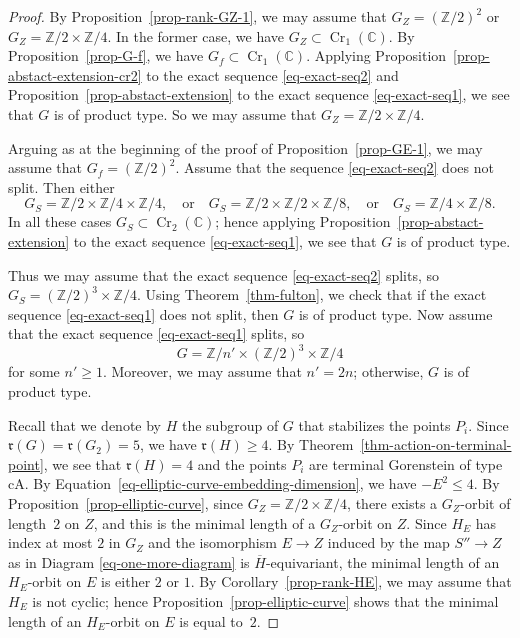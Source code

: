 \documentclass[11pt]{amsart}
\numberwithin{equation}{section}
\theoremstyle{definition}
\theoremstyle{remark}
\DeclareMathOperator{\Cr}{Cr}
\begin{document}
\begin{proof}
By Proposition~\ref{prop-rank-GZ-1}, we may assume that $G_Z=(\mathbb{Z}/2)^2$ or $G_Z=\mathbb{Z}/2\times\mathbb{Z}/4$. 
In the former case, we have $G_Z\subset \Cr_1(\mathbb{C})$. By Proposition~\ref{prop-G-f}, we have $G_f\subset \Cr_1(\mathbb{C})$. Applying Proposition~\ref{prop-abstact-extension-cr2} to the exact sequence \eqref{eq-exact-seq2} and Proposition~\ref{prop-abstact-extension} to the exact sequence \eqref{eq-exact-seq1}, we see that $G$ is of product type. 
So we may assume that $G_Z=\mathbb{Z}/2\times\mathbb{Z}/4$. 

 Arguing as at the beginning of the proof of Proposition~\ref{prop-GE-1}, we may assume that $G_f=(\mathbb{Z}/2)^2$. 
Assume that the sequence \eqref{eq-exact-seq2} does not split. Then either 
\[
G_S= \mathbb{Z}/2\times\mathbb{Z}/4\times\mathbb{Z}/4, \quad \text{or} \quad G_S= \mathbb{Z}/2\times\mathbb{Z}/2\times\mathbb{Z}/8,  \quad \text{or} \quad G_S= \mathbb{Z}/4\times\mathbb{Z}/8.
\] 
In all these cases $G_S\subset \Cr_2(\mathbb{C})$; hence applying Proposition~\ref{prop-abstact-extension} to the exact sequence \eqref{eq-exact-seq1}, we see that $G$ is of product type.

Thus we may assume that the exact sequence \eqref{eq-exact-seq2} splits, so $G_S= (\mathbb{Z}/2)^3\times \mathbb{Z}/4$. Using Theorem~\ref{thm-fulton}, we check that if the exact sequence \eqref{eq-exact-seq1} does not split, then $G$ is of product type.  
Now assume that the exact sequence \eqref{eq-exact-seq1} splits, so 
\[
G=\mathbb{Z}/n'\times (\mathbb{Z}/2)^3\times \mathbb{Z}/4
\] 
for some $n'\geq 1$.
Moreover, we may assume that $n'=2n$; otherwise, $G$ is of product type. 

Recall that we denote by $H$ the subgroup of  $G$ that stabilizes the points $P_i$. 
Since $\mathfrak{r}(G)=\mathfrak{r}(G_2)= 5$, we have $\mathfrak{r}(H)\geq 4$. 
By Theorem~\ref{thm-action-on-terminal-point}, we see that $\mathfrak{r}(H)=4$ and the points $P_i$ are terminal Gorenstein of type cA. By Equation~\eqref{eq-elliptic-curve-embedding-dimension}, we have $-E^2\leq 4$.  
By Proposition~\ref{prop-elliptic-curve}, since $G_Z=\mathbb{Z}/2\times \mathbb{Z}/4$, there exists a $G_Z$-orbit of length~$2$ on $Z$, and this is the minimal length of a $G_Z$-orbit on $Z$. 
Since $H_E$ has index at most $2$ in $G_Z$ and the isomorphism $E\to Z$ induced by the map $S''\to Z$ as in Diagram \eqref{eq-one-more-diagram} is $\overline H$-equivariant, the minimal length of an $H_E$-orbit on $E$ is either $2$ or $1$. 
By Corollary~\ref{prop-rank-HE}, we may assume that $H_E$ is not cyclic; hence Proposition~\ref{prop-elliptic-curve} shows that the minimal length of an $H_E$-orbit on $E$ is equal to~$2$.


\end{proof}
\end{document}
